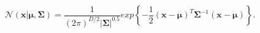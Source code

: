 \begin{equation}
\label{eq:multivariategaussiandistribution}
\mathcal{N}(\mathbf{x} | \boldsymbol{\mu}, \mathbf{\Sigma}) = 
\frac{1}{(2 \pi)^{D/2} |\boldsymbol\Sigma|^{0.5}} 
exp \left\{ - \frac{1}{2} (\mathbf{x} - \boldsymbol{\mu})^T 
\boldsymbol\Sigma^{-1}  (\mathbf{x} - \boldsymbol{\mu})
\right\} .
\end{equation}
